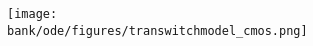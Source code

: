 \begin{figure}[H]
  \begin{center}
    \texttt{[image: \\bank/ode/figures/transwitchmodel\_cmos.png]}
  \end{center}
  \label{fig:cmos}
\end{figure}
